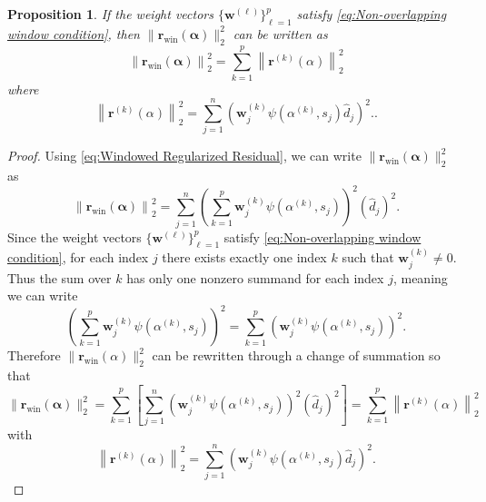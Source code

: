 \documentclass[12pt]{article}
\newcommand{\rVec}{\mathbf{r}}	%
\newcommand{\wVec}{\mathbf{w}}	%
\newcommand{\dft}[1]{\widehat{#1}}	%
\newcommand{\regparam}{\alpha}  %
\newcommand{\regparamVec}{\bm{\regparam}}   %
\newcommand{\mfilt}{\psi}
\newcommand{\singular}{s}	%
\newtheorem{proposition}{Proposition}[section]
\begin{document}
\begin{proposition}
\label{prop:Non-overlapping windows}
If the weight vectors $\{\wVec^{(\ell)}\}_{\ell=1}^{p}$ satisfy \eqref{eq:Non-overlapping window condition}, then $\|\rVec_{\text{win}}(\regparamVec)\|_2^2$ can be written as
\[\left\|\rVec_{\text{win}}(\regparamVec)\right\|_2^2 = \sum_{k=1}^{p} \left\|\rVec^{(k)}(\regparam)\right\|_2^2\]
where
\[\left\|\rVec^{(k)}(\regparam)\right\|_2^2 = \sum_{j=1}^{n} \left( \wVec_j^{(k)} \mfilt\left(\regparam^{(k)},\singular_j\right)\dft{d}_j\right)^2..\]
\end{proposition}
\begin{proof}
Using \eqref{eq:Windowed Regularized Residual}, we can write $\|\rVec_{\text{win}}(\regparamVec)\|_2^2$ as
\[\left\|\rVec_{\text{win}}(\regparamVec)\right\|_2^2 = \sum_{j=1}^{n} \left(\sum_{k=1}^{p} \wVec_j^{(k)} \mfilt\left(\regparam^{(k)},\singular_j\right) \right)^2 \left(\dft{d}_j\right)^2.\]
Since the weight vectors $\{\wVec^{(\ell)}\}_{\ell=1}^{p}$ satisfy \eqref{eq:Non-overlapping window condition}, for each index $j$ there exists exactly one index $k$ such that $\wVec^{(k)}_j \neq 0$. Thus the sum over $k$ has only one nonzero summand for each index $j$, meaning we can write
\[\left(\sum_{k=1}^{p} \wVec_j^{(k)} \mfilt\left(\regparam^{(k)},\singular_j\right) \right)^2 = \sum_{k=1}^{p} \left( \wVec_j^{(k)} \mfilt\left(\regparam^{(k)},\singular_j\right)\right)^2.\]
Therefore $\|\rVec_{\text{win}}(\regparam)\|_2^2$ can be rewritten through a change of summation so that
\[\|\rVec_{\text{win}}(\regparamVec)\|_2^2 = \sum_{k=1}^{p} \left[ \sum_{j=1}^{n} \left( \wVec_j^{(k)} \mfilt\left(\regparam^{(k)},\singular_j\right) \right)^2 \left(\dft{d}_j\right)^2\right] = \sum_{k=1}^{p} \left\|\rVec^{(k)}(\regparam)\right\|_2^2\]
with
\[\left\|\rVec^{(k)}(\regparam)\right\|_2^2 = \sum_{j=1}^{n} \left( \wVec_j^{(k)} \mfilt\left(\regparam^{(k)},\singular_j\right)\dft{d}_j\right)^2.\]
\end{proof}
\end{document}
